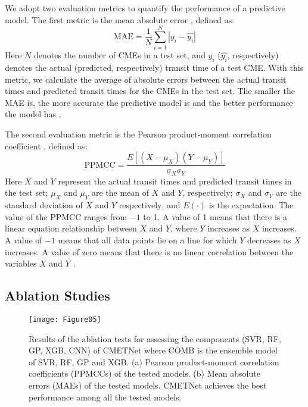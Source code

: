 \documentclass{article}
\begin{document}
We adopt two evaluation metrics to quantify the performance of a predictive model.
The first metric is the mean absolute error \citep[MAE;][]{DBLP:journals/siamrev/Berk92}, defined as:
\begin{equation}
\mbox{MAE} = \frac{1}{N} \sum_{i=1}^{N}\left | y_{i} - \hat{y_{i}} \right |
\end{equation}
Here $N$ denotes the number of CMEs in a test set, and
$y_{i}$ ($\hat{y_{i}}$, respectively) denotes the actual (predicted, respectively) transit time of a test CME.
With this metric, we calculate the average of absolute errors between
the actual transit times and predicted transit times
for the CMEs in the test set.
The smaller the MAE is, the more accurate the predictive model is 
and the better performance the model has \citep{Liu_2020_ppmcc}.

The second evaluation metric is the 
Pearson product-moment correlation coefficient \citep[PPMCC;][]{Pearson_PPMCC}, defined as:
\begin{equation}
\mbox{PPMCC} = \frac{E[(X-\mu _X)(Y-\mu _Y)]}{\sigma _X \sigma_Y}
\end{equation}
Here $X$ and $Y$ represent the actual transit times and predicted transit times in the test set;
$\mu_X$ and $\mu_Y$ are the mean of $X$ and $Y$, respectively; 
$\sigma_X$ and $\sigma_Y$ are the standard deviation of $X$ and $Y$ respectively; 
and $E(\cdot)$ is the expectation. 
The value of the PPMCC ranges from $-1$ to 1. 
A value of 1 means that there is a linear equation relationship between $X$ and $Y$, 
where $Y$ increases as $X$ increases. 
A value of $-1$ means that all data points lie on a line for which $Y$ decreases as $X$ increases. 
A value of zero means that there is no linear correlation between the variables $X$
and $Y$ \citep{Liu_2020_ppmcc}.

\subsection{Ablation Studies}

\begin{figure*}[ht]
\begin{center}
\texttt{[image: Figure05]}
\end{center}
\caption{Results of the ablation tests for assessing the components 
(SVR, RF, GP, XGB, CNN)
of CMETNet where
COMB is the ensemble model of SVR, RF, GP and XGB.
(a) Pearson product-moment correlation coefficients (PPMCCs) of the tested models.
(b) Mean absolute errors (MAEs) of the tested models.
CMETNet achieves the best performance among all the tested models.}
\label{fig:ablation}
\end{figure*}
\end{document}
